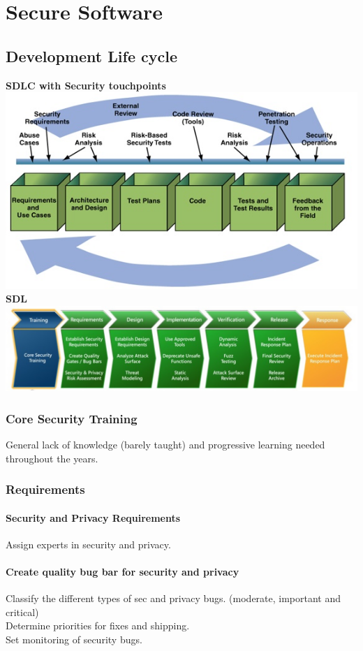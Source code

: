 \documentclass[10pt,a4paper,final]{report}
\author{Gérard Tio Nogueras}
\begin{document}
\chapter{Secure Software}
\section{Development Life cycle}
\textbf{SDLC with Security touchpoints}\\
\includegraphics[scale=.65]{cycle.jpg}\\
\textbf{SDL}\\
\includegraphics[scale=.35]{SDL.jpg}\\
\subsection{Core Security Training}
General lack of knowledge (barely taught) and progressive learning needed throughout the years.
\subsection{Requirements}
\subsubsection{Security and Privacy Requirements}
Assign experts in security and privacy.
\subsubsection{Create quality bug bar for security and privacy}
Classify the different types of sec and privacy bugs. (moderate, important and critical)\\
Determine priorities for fixes and shipping.\\
Set monitoring of security bugs.
\end{document}
